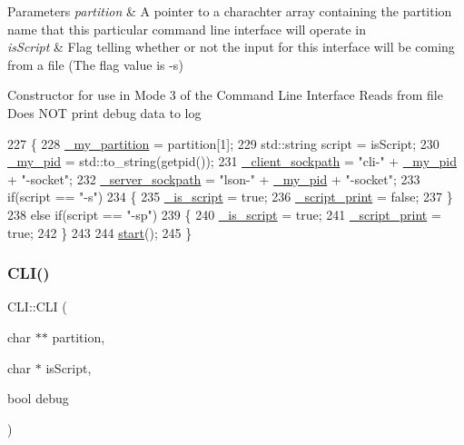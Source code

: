 \begin{DoxyParams}{Parameters}
{\em partition} & A pointer to a charachter array containing the partition name that this particular command line interface will operate in\\
\hline
{\em is\+Script} & Flag telling whether or not the input for this interface will be coming from a file (The flag value is \textquotesingle{}-\/s\textquotesingle{})\\
\hline
\end{DoxyParams}
Constructor for use in Mode 3 of the Command Line Interface Reads from file Does N\+OT print debug data to log 
\begin{DoxyCode}
227 \{
228   \mbox{\hyperlink{class_c_l_i_aa58101a66621f7b2b64d4e566ad7bd89}{\_my\_partition}} = partition[1];
229   std::string script = isScript;
230   \mbox{\hyperlink{class_c_l_i_a589aa7edb9b2454720d5b54af3ddea00}{\_my\_pid}} = std::to\_string(getpid());
231   \mbox{\hyperlink{class_c_l_i_ad3b7579608f8c2e1d4c01a8668f701d9}{\_client\_sockpath}} = \textcolor{stringliteral}{"cli-"} + \mbox{\hyperlink{class_c_l_i_a589aa7edb9b2454720d5b54af3ddea00}{\_my\_pid}} + \textcolor{stringliteral}{"-socket"};
232   \mbox{\hyperlink{class_c_l_i_a582f907a9e5dc5c0dcd264e2f1b14f76}{\_server\_sockpath}} = \textcolor{stringliteral}{"lson-"} + \mbox{\hyperlink{class_c_l_i_a589aa7edb9b2454720d5b54af3ddea00}{\_my\_pid}} + \textcolor{stringliteral}{"-socket"};
233   \textcolor{keywordflow}{if}(script == \textcolor{stringliteral}{"-s"})
234   \{
235     \mbox{\hyperlink{class_c_l_i_a93c65474d55597296ddda4739664ea27}{\_is\_script}} = \textcolor{keyword}{true};
236     \mbox{\hyperlink{class_c_l_i_a294b192f7400c451c7d4ee983ca11d21}{\_script\_print}} = \textcolor{keyword}{false};
237   \}
238   \textcolor{keywordflow}{else} \textcolor{keywordflow}{if}(script == \textcolor{stringliteral}{"-sp"})
239   \{
240     \mbox{\hyperlink{class_c_l_i_a93c65474d55597296ddda4739664ea27}{\_is\_script}} = \textcolor{keyword}{true};
241     \mbox{\hyperlink{class_c_l_i_a294b192f7400c451c7d4ee983ca11d21}{\_script\_print}} = \textcolor{keyword}{true};
242   \}
243 
244   \mbox{\hyperlink{class_c_l_i_a1492005f186392031bd4d447cb20e975}{start}}();
245 \}
\end{DoxyCode}
\mbox{\label{class_c_l_i_a5d9746160fc642addd9b4aff6cc4eef2}} 
\subsubsection{\texorpdfstring{C\+L\+I()}{CLI()}\hspace{0.1cm}{\footnotesize\ttfamily [4/4]}}
{\footnotesize\ttfamily C\+L\+I\+::\+C\+LI (\begin{DoxyParamCaption}\item[{char $\ast$$\ast$}]{partition,  }\item[{char $\ast$}]{is\+Script,  }\item[{bool}]{debug }\end{DoxyParamCaption})}


